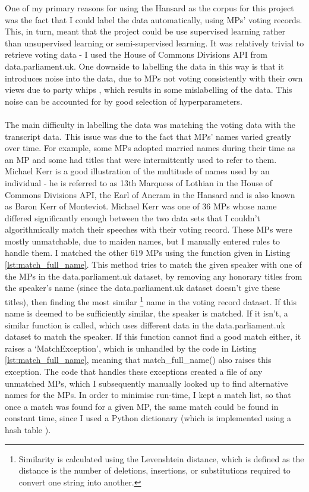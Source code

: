 \documentclass[12pt,a4paper,twoside,openright]{report}
\begin{document}
One of my primary reasons for using the Hansard as the corpus for this project was the fact that I could label the data automatically, using MPs' voting records. This, in turn, meant that the project could be use supervised learning rather than unsupervised learning or semi-supervised learning. It was relatively trivial to retrieve voting data - I used the House of Commons Divisions API from data.parliament.uk. One downside to labelling the data in this way is that it introduces noise into the data, due to MPs not voting consistently with their own views due to party whips \cite{whips}, which results in some mislabelling of the data. This noise can be accounted for by good selection of hyperparameters.
\\\\
The main difficulty in labelling the data was matching the voting data with the transcript data. This issue was due to the fact that MPs' names varied greatly over time. For example, some MPs adopted married names during their time as an MP and some had titles that were intermittently used to refer to them. Michael Kerr is a good illustration of the multitude of names used by an individual - he is referred to as 13th Marquess of Lothian in the House of Commons Divisions API, the Earl of Ancram in the Hansard and is also known as Baron Kerr of Monteviot. Michael Kerr was one of 36 MPs whose name differed significantly enough between the two data sets that I couldn't algorithmically match their speeches with their voting record. These MPs were mostly unmatchable, due to maiden names, but I manually entered rules to handle them. I matched the other 619 MPs using the function given in Listing \ref{lst:match_full_name}. This method tries to match the given speaker with one of the MPs in the data.parliament.uk dataset, by removing any honorary titles from the speaker's name (since the data.parliament.uk dataset doesn't give these titles), then finding the most similar \footnote{Similarity is calculated using the Levenshtein distance, which is defined as the distance is the number of deletions, insertions, or substitutions required to convert one string into another.} name in the voting record dataset. If this name is deemed to be sufficiently similar, the speaker is matched. If it isn't, a similar function is called, which uses different data in the data.parliament.uk dataset to match the speaker. If this function cannot find a good match either, it raises a `MatchException', which is unhandled by the code in Listing \ref{lst:match_full_name}, meaning that match\_full\_name() also raises this exception. The code that handles these exceptions created a file of any unmatched MPs, which I subsequently manually looked up to find alternative names for the MPs. In order to minimise run-time, I kept a match list, so that once a match was found for a given MP, the same match could be found in constant time, since I used a Python dictionary (which is implemented using a hash table \cite{pythonfaqs}).
\end{document}
